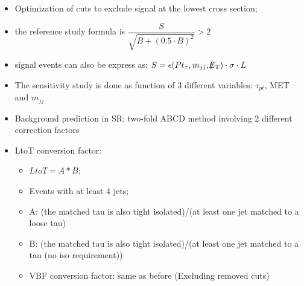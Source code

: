 \begin{itemize}
	\item Optimization of cuts to exclude signal at the lowest cross section;
	\item the reference study formula is $\dfrac{S}{\sqrt{B + (0.5 \cdot B)^{2}}} > 2$
	\item signal events can also be express as: $S = \epsilon ( Pt_{\tau} , m_{jj} ,  \slash\mkern-12mu{E}_{\text{T}} )\cdot \sigma \cdot L$
	\item The sensitivity study is done as function of 3 different variables: $\tau_{pt}$, MET and $m_{jj}$
	\item Background prediction in SR: two-fold ABCD method involving 2 different correction factors
	\item LtoT conversion factor:
	\begin{itemize}
		\item $LtoT = A * B$;
		\item Events with at least 4 jets;
		\item A: (the matched tau 
		is also tight isolated)/(at least one jet matched 
		to a loose tau)
		\item B: (the matched tau 
		is also tight isolated)/(at least one jet matched 
		to a tau (no iso requirement))
	\item VBF conversion factor: same as before (Excluding removed cuts)
	\end{itemize}
\end{itemize}

